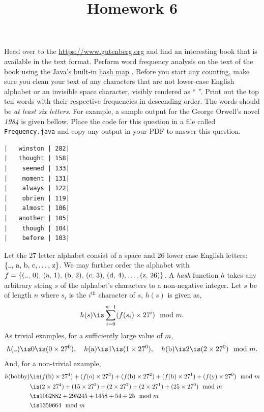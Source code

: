 \documentclass{homework}
\title{Homework 6}
\newcommand\hashmap{%
  \href{%
    https://docs.oracle.com/javase/8/docs/api/java/util/HashMap.html%
  }{hash map}%
}
\renewcommand\textvisiblespace[1][.5em]{%
  \makebox[#1]{%
    \kern.07em
    \vrule height.3ex
    \hrulefill
    \vrule height.3ex
    \kern.07em
  }%
}
\begin{document}
 \maketitle

\question Head over to the \url{https://www.gutenberg.org} and find an
interesting book that is available in the text format. Perform word
frequency analysis on the text of the book using the Java's built-in
\hashmap. Before you start any counting, make sure you clean your text
of any characters that are not lower-case English alphabet or an
invisible space character, visibly rendered as
``\textvisiblespace''. Print out the top ten words with their
respective frequencies in descending order. The words should be
\textit{at least six letters}. For example, a sample output for the
George Orwell's novel \textit{1984} is given bellow. Place the code
for this question in a file called \texttt{Frequency.java} and copy
any output in your PDF to answer this question.

\begin{verbatim}
|   winston | 282|
|   thought | 158|
|    seemed | 133|
|    moment | 131|
|    always | 122|
|    obrien | 119|
|    almost | 106|
|   another | 105|
|    though | 104|
|    before | 103|
\end{verbatim}

\question Let the 27 letter alphabet consist of a space and 26 lower case
English letters: $\{\text{\textvisiblespace, a, b, c,} \hdots
  \text{, z}\}$. We may further order the alphabet with $f =
  \{\text{(\textvisiblespace, 0), (a, 1), (b, 2), (c, 3), (d,
    4),}\hdots, \text{(z, 26)}\}$. A \emph{hash} function $h$ takes
any arbitrary string $s$ of the alphabet's characters to a
non-negative integer. Let $s$ be of length $n$ where $s_i$ is the
$i^\text{th}$ character of $s$, $h(s)$ is given as,
\[
  h(s) \is \sum_{i=0}^{n-1}(f(s_{i})\times 27^i) \mod m.
\]
As trivial examples, for a sufficiently large value of $m$,
\[
  h(\text{\textvisiblespace})  \is 0 \is (0 \times 27^0), \quad
  h(\text{a})                  \is 1 \is (1 \times 27^0), \quad
  h(\text{b})                  \is 2 \is (2 \times 27^0) \mod m.
\]
And, for a non-trivial example,
\begin{align*}
  h(\text{bobby})
   & \is (f(\text{b}) \times 27^4)+(f(\text{o}) \times 27^3)+(f(\text{b}) \times 27^2)+(f(\text{b}) \times 27^1)+(f(\text{y}) \times 27^0) \mod m \\
   & \is (2 \times 27^4)+(15 \times 27^3)+(2 \times 27^2)+(2 \times 27^1)+(25 \times 27^0) \mod m                                                 \\
   & \is 1062882 + 295245 + 1458 + 54 + 25 \mod m                                                                                                 \\
   & \is 1359664 \mod m
\end{align*}
\end{document}
